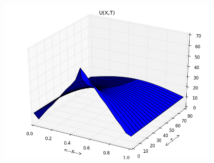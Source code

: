 \documentclass[letterpaper, 11 pt, conference]{ieeeconf}
\begin{document}
\begin{figure}
\includegraphics[scale=0.35]{plot_test_original_tri_4.png}
\end{figure}
\end{document}
